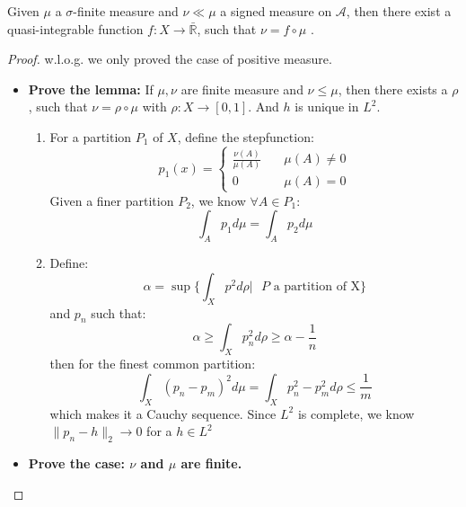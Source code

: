 \begin{theorem}
	Given $\mu$ a $\sigma$-finite measure and $\nu \ll \mu$ a signed measure on $\mathcal{A}$, then there exist a quasi-integrable function $f: X \rightarrow \bar{\mathbb{R}}$, such that $\nu = f \circ \mu$ . 
\end{theorem}
\begin{proof}
	w.l.o.g. we only proved the case of positive measure.
	\begin{itemize}
		\item \textbf{Prove the lemma:} If $\mu, \nu$ are finite measure and $\nu \leq \mu$, then there exists a $\rho$, such that $\nu = \rho \circ \mu$ with $\rho: X \rightarrow [0, 1]$. And $h$ is unique in $L^2$. \par
			 
		\begin{enumerate}
			\item For a partition $P_1$ of $X$, define the stepfunction:
				\begin{equation*}
					p_1(x) =\left\{ \begin{aligned}
						\frac{\nu(A)}{\mu(A)} \quad &\mu(A) \neq 0 \\
						0 \quad &\mu(A) = 0
					\end{aligned}
					\right.
				\end{equation*}
			Given a finer partition $P_2$, we know $\forall A \in P_1:$
				\begin{equation*}
					\int_A p_1 d\mu = \int_A p_2 d\mu 
				\end{equation*} 
			\item Define:
				\begin{equation*}
					\alpha = \sup\{\int_X p^2 d\rho |\text{ $P$ a partition of X} \}
				\end{equation*}
				and $p_n$ such that:
				\begin{equation*}
					\alpha \geq \int_X p_n^2 d\rho \geq \alpha - \frac{1}{n} 
				\end{equation*}
				then for the finest common partition:
				\begin{equation*}
					\int_X (p_n - p_m)^2 d \mu = \int_X p_n^2 - p_m^2 d\rho \leq \frac{1}{m}
				\end{equation*}
				which makes it a Cauchy sequence. Since $L^2$ is complete, we know $\|p_n - h\|_2 \rightarrow 0$ for a $h \in L^2$
		\end{enumerate}
		\item \textbf{Prove the case: $\nu$ and $\mu$ are finite.}\par 

\end{itemize}
\end{proof}
